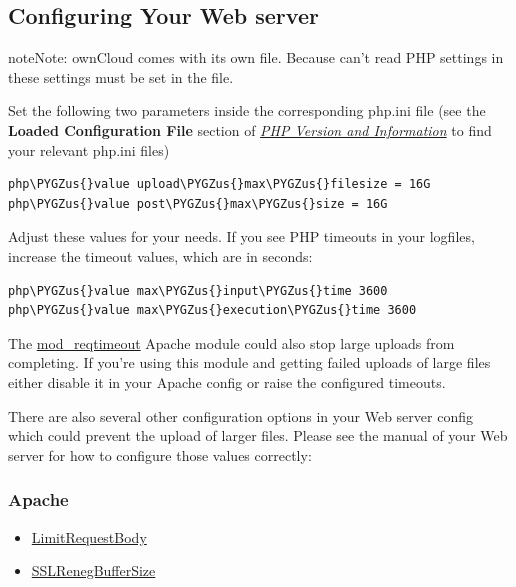 \documentclass[letterpaper,10pt,english]{sphinxmanual}
\def\PYGZus{\char`\_}
\begin{document}
\subsection{Configuring Your Web server}
\label{configuration_files/big_file_upload_configuration:configuring-your-web-server}
\begin{notice}{note}{Note:}
ownCloud comes with its own  file. Because 
can't read PHP settings in  these settings must be set in the
 file.
\end{notice}

Set the following two parameters inside the corresponding php.ini file (see the
\textbf{Loaded Configuration File} section of {\hyperref[issues/general_troubleshooting:label-phpinfo]{\emph{PHP Version and Information}}} to find your
relevant php.ini files)

\begin{Verbatim}[commandchars=\\\{\}]
php\PYGZus{}value upload\PYGZus{}max\PYGZus{}filesize = 16G
php\PYGZus{}value post\PYGZus{}max\PYGZus{}size = 16G
\end{Verbatim}

Adjust these values for your needs. If you see PHP timeouts in your logfiles,
increase the timeout values, which are in seconds:

\begin{Verbatim}[commandchars=\\\{\}]
php\PYGZus{}value max\PYGZus{}input\PYGZus{}time 3600
php\PYGZus{}value max\PYGZus{}execution\PYGZus{}time 3600
\end{Verbatim}

The \href{https://httpd.apache.org/docs/current/mod/mod\_reqtimeout.html}{mod\_reqtimeout}
Apache module could also stop large uploads from completing. If you're using this
module and getting failed uploads of large files either disable it in your Apache
config or raise the configured  timeouts.

There are also several other configuration options in your Web server config which
could prevent the upload of larger files. Please see the manual of your Web server
for how to configure those values correctly:


\subsubsection{Apache}
\label{configuration_files/big_file_upload_configuration:apache}\begin{itemize}
\item {} 
\href{https://httpd.apache.org/docs/current/en/mod/core.html\#limitrequestbody}{LimitRequestBody}

\item {} 
\href{https://httpd.apache.org/docs/current/mod/mod\_ssl.html\#sslrenegbuffersize}{SSLRenegBufferSize}

\end{itemize}
\end{document}
